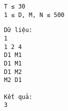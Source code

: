 \begin{verbatim}
T ≤ 30
1 ≤ D, M, N ≤ 500
\end{verbatim}
\begin{verbatim}
Dữ liệu:
1
1 2 4
D1 M1
D1 M1
D1 M2
M2 D1

Kết quả:
3

\end{verbatim}